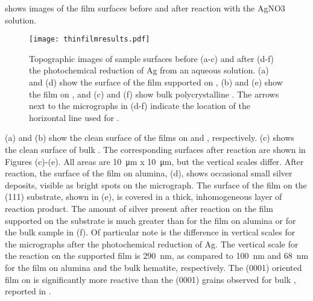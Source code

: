  shows  images of the film surfaces before and after reaction with the AgNO3 solution.  
\begin{figure}
	\texttt{[image: thinfilmresults.pdf]}
	\caption[Images of thin film surfaces after reaction]{%
		Topographic  images of sample surfaces before (a-c) and 
		after (d-f) the photochemical reduction of Ag from an aqueous 
		 solution. (a) and (d) show the surface of the 
		 film supported on , (b) and (e) show 
		the  film on , and (c) and (f) show bulk 
		polycrystalline . The arrows next to the micrographs 
		in (d-f) indicate the location of the horizontal line used for 
		.}
	\label{fig:thinfilmresults}
\end{figure}
(a) and (b) show the clean surface of the  films on  and , respectively.  (c) shows the clean surface of bulk . The corresponding surfaces after reaction are shown in Figures (c)-(e). All areas are \SI{10}{\micro\meter} x \SI{10}{\micro\meter}, but the vertical scales differ. After reaction, the surface of the film on alumina, (d), shows occasional small silver deposits, visible as bright spots on the micrograph.  The surface of the film on the (111) substrate, shown in (e), is covered in a thick, inhomogeneous layer of reaction product.  The amount of silver present after reaction on the film supported on the  substrate is much greater than for the film on alumina or for the bulk sample in (f).  Of particular note is the difference in vertical scales for the micrographs after the photochemical reduction of Ag.  The vertical scale for the reaction on the  supported film is \SI{290}{\nano\meter}, as compared to \SI{100}{\nano\meter} and \SI{68}{\nano\meter} for the film on alumina and the bulk hematite, respectively. The (0001) oriented film on  is significantly more reactive than the (0001) grains observed for bulk , reported in .


